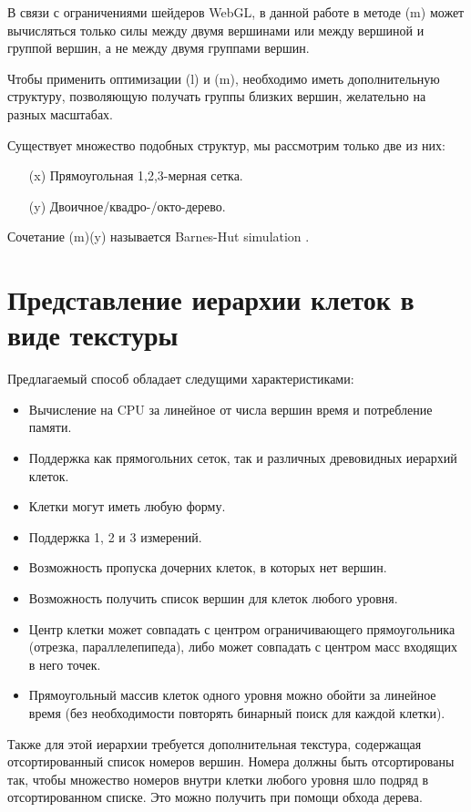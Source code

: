 В связи с ограничениями шейдеров WebGL, в данной работе в методе (m) может вычисляться только силы между двумя вершинами или между вершиной и группой вершин, а не между двумя группами вершин.

Чтобы применить оптимизации (l) и (m), необходимо иметь дополнительную структуру, позволяющую получать группы близких вершин, желательно на разных масштабах.

Существует множество подобных структур, мы рассмотрим только две из них:

\begin{itemize}
\item[(x)] Прямоугольная 1,2,3-мерная сетка.
\item[(y)] Двоичное/квадро-/окто-дерево.
\end{itemize}

Сочетание (m)(y) называется Barnes-Hut simulation \cite{barnes_hut}.

\section{Представление иерархии клеток в виде текстуры}

\label{sec:struct_texture}

Предлагаемый способ обладает следущими характеристиками:

\begin{itemize}
\item Вычисление на CPU за линейное от числа вершин время и потребление памяти.
\item Поддержка как прямогольних сеток, так и различных древовидных иерархий клеток.
\item Клетки могут иметь любую форму.
\item Поддержка 1, 2 и 3 измерений.
\item Возможность пропуска дочерних клеток, в которых нет вершин.
\item Возможность получить список вершин для клеток любого уровня.
\item Центр клетки может совпадать с центром ограничивающего прямоугольника (отрезка, параллелепипеда), либо может совпадать с центром масс входящих в него точек.
\item Прямоугольный массив клеток одного уровня можно обойти за линейное время (без необходимости повторять бинарный поиск для каждой клетки).
\end{itemize}

Также для этой иерархии требуется дополнительная текстура, содержащая отсортированный список номеров вершин. Номера должны быть отсортированы так, чтобы множество номеров внутри клетки любого уровня шло подряд в отсортированном списке. Это можно получить при помощи обхода дерева.

